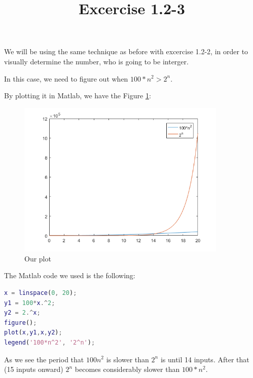 \documentclass{article}
\title{Excercise 1.2-3}
\begin{document}
\date{}
\author{}

\maketitle

We will be using the same technique as before with excercise 1.2-2, in order to visually determine the number, who is going to be interger.

In this case, we need to figure out when $ 100*n^{2} > 2^{n} $.

By plotting it in Matlab, we have the Figure \ref{fig:plot1}:

\begin{figure}
    \includegraphics[width=10cm]{images/1-2-3.png}
    \centering
    \caption{Our plot}
    \label{fig:plot1}
\end{figure}

The Matlab code we used is the following:

\begin{lstlisting}[language=Matlab]
x = linspace(0, 20);
y1 = 100*x.^2;
y2 = 2.^x;
figure();
plot(x,y1,x,y2);
legend('100*n^2', '2^n');
\end{lstlisting}

As we see the period that $100n^{2}$ is slower than $2^{n}$ is until 14 inputs. After that (15 inputs onward) $2^{n}$ becomes considerably slower than $100*n^{2}$.
\end{document}
